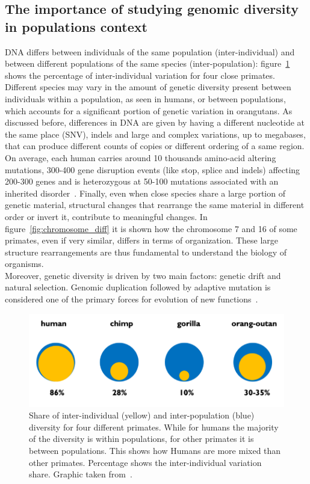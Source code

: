 \subsection{The importance of studying genomic diversity in populations context}
DNA differs between individuals of the same population (inter-individual) and between different populations of the same species (inter-population): figure~\ref{fig:pop_diff} shows the percentage of inter-individual variation for four close primates. Different species may vary in the amount of genetic diversity present between individuals within a population, as seen in humans, or between populations, which accounts for a significant portion of genetic variation in orangutans. As discussed before, differences in DNA are given by having a different nucleotide at the same place (SNV), indels and large and complex variations, up to megabases, that can produce different counts of copies or different ordering of a same region.\\
On average, each human carries around 10 thousands amino-acid altering mutations, 300-400 gene disruption events (like stop, splice and indels) affecting 200-300 genes and is heterozygous at 50-100 mutations associated with an inherited disorder~\cite{genome_diversity_quintana}. 
Finally, even when close species share a large portion of genetic material, structural changes that rearrange the same material in different order or invert it, contribute to meaningful changes. In figure~\ref{fig:chromosome_diff} it is shown how the chromosome 7 and 16 of some primates, even if very similar, differs in terms of organization. These large structure rearrangements are thus fundamental to understand the biology of organisms.\\
Moreover, genetic diversity is driven by two main factors: genetic drift and natural selection. Genomic duplication followed by adaptive mutation is considered one of the primary forces for evolution of new functions~\cite{tbc1d3}.
\begin{figure}[!ht]
	\centering
	\includegraphics[width=.8\linewidth]{figures/background/pop_diff.png}
	\caption[Inter-individual and inter-population variation for 4 primate species.]{Share of inter-individual (yellow) and inter-population (blue) diversity for four different primates. While for humans the  majority of the diversity is within populations, for other primates it is between populations. This shows how Humans are more mixed than other primates. Percentage shows the inter-individual variation share. Graphic taken from~\cite{genome_diversity_quintana}.}
	\label{fig:pop_diff}
\end{figure}

